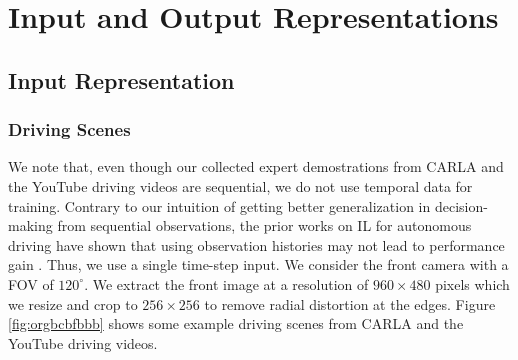 \documentclass[12pt, letterpaper,cleardoubleempty,BCOR1cm]{scrbook}
\begin{document}
\section{Input and Output Representations}
\label{sec:org9b13cb9}

\subsection{Input Representation}
\label{sec:orgcfa2320}

\subsubsection{Driving Scenes}
\label{sec:orgbe4fb75}
We note that, even though our collected expert demostrations from CARLA and the
YouTube driving videos are sequential, we do not use temporal data for
training. Contrary to our intuition of getting better generalization in
decision-making from sequential observations, the prior works on IL for
autonomous driving have shown that using observation histories may not lead to
performance gain \cite{Haan2019,Muller2006,Bansal2018,Wang2019a}. Thus, we use a
single time-step input. We consider the front camera with a FOV of
\(120^{\circ}\). We extract the front image at a resolution of \(960 \times 480\)
pixels which we resize and crop to \(256 \times 256\) to remove radial distortion at
the edges. Figure \ref{fig:orgbcbfbbb} shows some example driving scenes from CARLA
and the YouTube driving videos.
\end{document}
